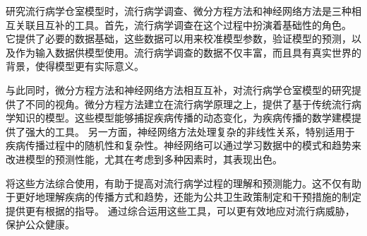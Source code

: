 \begin{discussion}

	研究流行病学仓室模型时，流行病学调查、微分方程方法和神经网络方法是三种相互关联且互补的工具。首先，流行病学调查在这个过程中扮演着基础性的角色。
	它提供了必要的数据基础，这些数据可以用来校准模型参数，验证模型的预测，以及作为输入数据供模型使用。流行病学调查的数据不仅丰富，而且具有真实世界的背景，使得模型更有实际意义。

	与此同时，微分方程方法和神经网络方法相互互补，对流行病学仓室模型的研究提供了不同的视角。微分方程方法建立在流行病学原理之上，提供了基于传统流行病学知识的模型。这些模型能够捕捉疾病传播的动态变化，为疾病传播的数学建模提供了强大的工具。
	另一方面，神经网络方法处理复杂的非线性关系，特别适用于疾病传播过程中的随机性和复杂性。神经网络可以通过学习数据中的模式和趋势来改进模型的预测性能，尤其在考虑到多种因素时，其表现出色。

	将这些方法综合使用，有助于提高对流行病学过程的理解和预测能力。这不仅有助于更好地理解疾病的传播方式和趋势，还能为公共卫生政策制定和干预措施的制定提供更有根据的指导。
	通过综合运用这些工具，可以更有效地应对流行病威胁，保护公众健康。
\end{discussion}